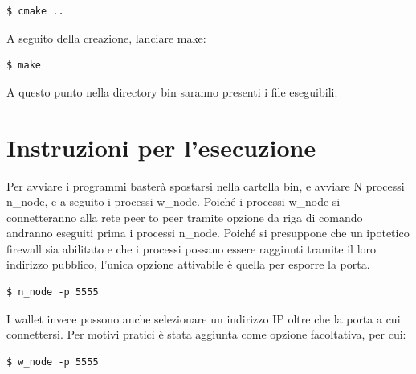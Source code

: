 \documentclass[a4paper,10pt]{report}
\begin{document}
\begin{lstlisting}
$ cmake ..
\end{lstlisting}
A seguito della creazione, lanciare make:

\begin{lstlisting}
$ make
\end{lstlisting}
A questo punto nella directory bin saranno presenti i file eseguibili.
\section{Instruzioni per l'esecuzione}\noindent
Per avviare i programmi basterà spostarsi nella cartella bin, e avviare N processi n\_node, e a seguito i processi w\_node. Poiché i processi w\_node si connetteranno alla rete peer to peer tramite opzione da riga di comando andranno eseguiti prima i processi n\_node.
Poiché si presuppone che un ipotetico firewall sia abilitato e che i processi possano essere raggiunti tramite il loro indirizzo pubblico, l'unica opzione attivabile è quella per esporre la porta.
\begin{lstlisting}
$ n_node -p 5555
\end{lstlisting}
I wallet invece possono anche selezionare un indirizzo IP oltre che la porta a cui connettersi. Per motivi pratici è stata aggiunta come opzione facoltativa, per cui:
\begin{lstlisting}
$ w_node -p 5555
\end{lstlisting}
\end{document}
